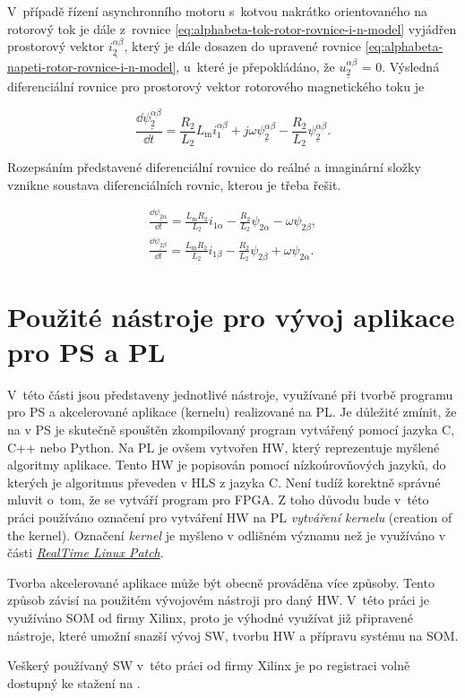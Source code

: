 \documentclass[a4paper, twoside, 11pt]{article}
\begin{document}
		V~případě řízení asynchronního motoru s~kotvou nakrátko orientovaného na rotorový tok je dále z~rovnice \ref{eq:alphabeta-tok-rotor-rovnice-i-n-model} vyjádřen prostorový vektor $\underline{i_2^{\alpha \beta}}$, který je dále dosazen do upravené rovnice \ref{eq:alphabeta-napeti-rotor-rovnice-i-n-model}, u~které je přepokládáno, že $\underline{u_{2}^{\alpha \beta}}$ = 0.
		Výsledná diferenciální rovnice pro prostorový vektor rotorového magnetického toku je

		\begin{equation}
			\frac{\dd{\underline{\psi_{2}^{\alpha \beta}}}}{\dd{t}} = \frac{R_2}{L_2}L_\text{m} i_1^{\alpha \beta} + j \omega \underline{\psi_2^{\alpha \beta}} - \frac{R_2}{L_2} \underline{\psi_2^{\alpha \beta}}.
		\end{equation}

		Rozepsáním představené diferenciální rovnice do reálné a imaginární složky vznikne soustava diferenciálních rovnic, kterou je třeba řešit.

		\begin{equation}
			\begin{gathered}
				\frac{\dd{\underline{\psi_{2\alpha}}}}{\dd{t}} = \frac{L_\text{m} R_2}{L_2} i_{1\alpha} - \frac{R_2}{L_2} \psi_{2\alpha} - \omega \psi_{2\beta},\\\frac{\dd{\underline{\psi_{2\beta}}}}{\dd{t}} = \frac{L_\text{m} R_2}{L_2} i_{1\beta} - \frac{R_2}{L_2} \psi_{2\beta} + \omega \psi_{2\alpha}.
			\end{gathered}
		\end{equation}


\section{Použité nástroje pro vývoj aplikace pro PS a PL}
V~této části jsou představeny jednotlivé nástroje, využívané při tvorbě programu pro PS a akcelerované aplikace (kernelu) realizované na PL. Je důležité zmínit, že na v PS je skutečně spouštěn zkompilovaný program vytvářený pomocí jazyka C, C++ nebo Python. Na PL je ovšem vytvořen HW, který reprezentuje myšlené algoritmy aplikace. Tento HW je popisován pomocí nízkoúrovňových jazyků, do kterých je algoritmus převeden v HLS z jazyka C. Není tudíž korektně správné mluvit o~tom, že se vytváří program pro FPGA. Z toho důvodu bude v~této práci používáno označení pro vytváření HW na PL \textit{vytváření kernelu} (creation of the kernel). Označení \textit{kernel} je myšleno v odlišném významu než je využíváno v části \hyperref[subsec:real-time-linux-patch]{\textit{RealTime Linux Patch}}.\par
Tvorba akcelerované aplikace může být obecně prováděna více způsoby. Tento způsob závisí na použitém vývojovém nástroji pro daný HW. V~této práci je využíváno SOM od firmy Xilinx, proto je výhodné využívat již připravené nástroje, které umožní snazší vývoj SW, tvorbu HW a přípravu systému na SOM.\par
	Veškerý používaný SW v~této práci od firmy Xilinx je po registraci volně dostupný ke stažení na \cite{xilinx-downloads}.
\end{document}
